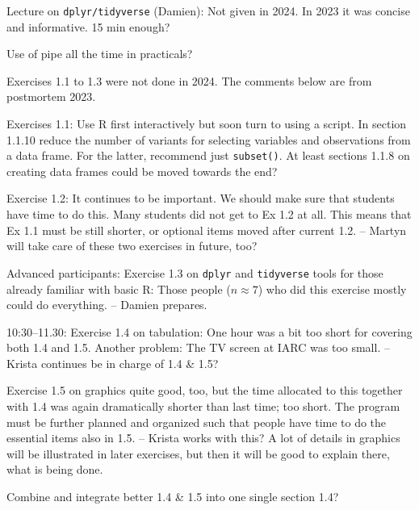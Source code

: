 \documentclass[11pt,a4]{article}
\begin{document}
Lecture on {\tt dplyr/tidyverse} (Damien): Not given in 2024. In 2023 it was concise and informative. 15 min enough? 

Use of pipe all the time in practicals?

Exercises 1.1 to 1.3 were not done in 2024. The comments below are from postmortem 2023.

Exercises 1.1: %
Use R first interactively but soon turn to using a script.
In section 1.1.10 reduce the number of variants for selecting variables and observations from a data frame. 
For the latter, recommend just  {\tt subset()}.
 At least sections 1.1.8 on creating data frames 
could be moved towards the end?

Exercise 1.2: It continues to be important. We should make sure that students have time to do this. 
Many students did not get to Ex 1.2 at all. 
This means that Ex 1.1 must be still shorter, or optional items moved after current 1.2.
-- Martyn will take care of these two exercises in future, too? 


Advanced participants: Exercise 1.3 on {\tt dplyr} and {\tt tidyverse} 
tools for those already familiar with basic R: 
Those people ($n \approx 7$) who did this exercise mostly could do everything. %
-- Damien prepares.

10:30--11.30: Exercise 1.4 on tabulation: 
One hour was a bit too short for covering both 1.4 and 1.5.
Another problem: The TV screen at IARC was too small. 
 -- Krista continues be in charge of 1.4 \& 1.5? 

Exercise 1.5 on graphics quite good, too, but the time allocated to this together with 1.4
was again dramatically shorter than last time; 
 too short. %
 The program must be further planned and organized such that
people have time to do the essential items also in 1.5. -- Krista works with this?
A lot of details in graphics will be illustrated in later exercises, but then it will be good to
explain there, what is being done. 

Combine and integrate better 1.4 \& 1.5 into one single section 1.4? 
\end{document}

